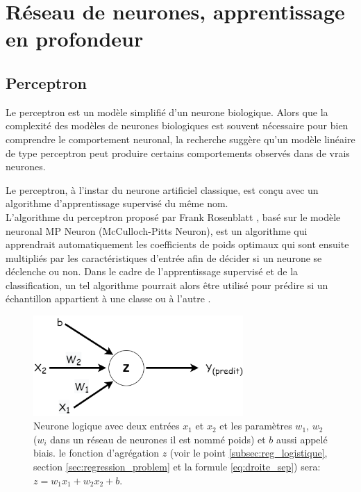 	
	\section{Réseau de neurones, apprentissage en profondeur}
	
	\subsection{Perceptron} \label{sec:perceptron}
	
	Le perceptron est un modèle simplifié d'un neurone biologique. Alors que la complexité des modèles de neurones biologiques est souvent nécessaire pour bien comprendre le comportement neuronal, la recherche suggère qu'un modèle linéaire de type perceptron peut produire certains comportements observés dans de vrais neurones.
	
	
	Le perceptron, à l'instar du neurone artificiel classique, est conçu avec un algorithme d'apprentissage supervisé du même nom.\\
	L'algorithme du perceptron proposé par Frank Rosenblatt \cite{antoine2018apprentissage}, basé sur le modèle neuronal MP Neuron (McCulloch-Pitts Neuron), est un algorithme qui apprendrait automatiquement les coefficients de poids optimaux qui sont ensuite multipliés par les caractéristiques d'entrée afin de décider si un neurone se déclenche ou non. Dans le cadre de l'apprentissage supervisé et de la classification, un tel algorithme pourrait alors être utilisé pour prédire si un échantillon appartient à une classe ou à l'autre \cite{ml2008python}.
	\begin{figure}[H]%
		\centering
		\includegraphics[width=8cm]{images/neuron-3-param.png}
		\caption[Neurone logique avec deux entrées $x_1$ et $x_2$ et les paramètres $w_1$, $w_2$ et $b$.]{Neurone logique avec deux entrées $x_1$ et $x_2$ et les paramètres $w_1$, $w_2$ ($w_i$ dans un réseau de neurones il est nommé poids) et $b$ aussi appelé biais. le fonction d'agrégation $z$ (voir le point \ref{subsec:reg_logistique}, section \ref{sec:regression_problem}  et la formule \ref{eq:droite_sep})  sera: $z=w_1 x_1 +w_2 x_2 + b$.}
		\label{fig:logic_neuron}
	\end{figure}
	
